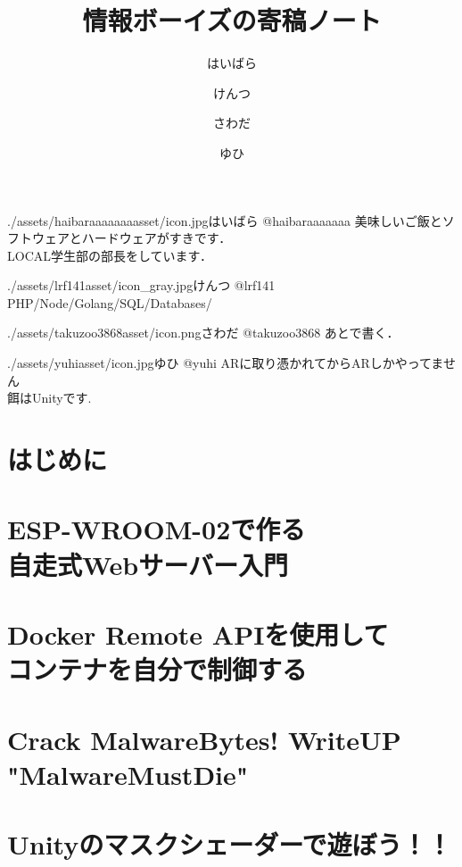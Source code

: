 \documentclass[autodetect-engine,dvipdfmx-if-dvi,ja=standard,b5paper,10.5pt,twoside,openany,layout=v2]{bxjsbook}
\title{情報ボーイズの寄稿ノート}
\author{はいばら \and けんつ \and さわだ \and ゆひ}
\date{}
\newcommand{\articlepath}{./articles}
\newcommand{\assetspath}{./assets}
\newcommand{\lrfasset}{\assetspath/lrf141asset}
\newcommand{\haibaraaaaaaaasset}{\assetspath/haibaraaaaaaaasset}
\newcommand{\yuhiasset}{\assetspath/yuhiasset}
\newcommand{\takuzooasset}{\assetspath/takuzoo3868asset}
\begin{document}
\frontmatter
\maketitle
\begin{myintroduce}{\haibaraaaaaaaasset/icon.jpg}{はいばら @haibaraaaaaaa}
  美味しいご飯とソフトウェアとハードウェアがすきです．\\
  LOCAL学生部の部長をしています．
\end{myintroduce}
\begin{myintroduce}{\lrfasset/icon_gray.jpg}{けんつ @lrf141}
  PHP/Node/Golang/SQL/Databases/
\end{myintroduce}
\begin{myintroduce}{\takuzooasset/icon.png}{さわだ @takuzoo3868}
  あとで書く．
\end{myintroduce}
\begin{myintroduce}{\yuhiasset/icon.jpg}{ゆひ @yuhi}
ARに取り憑かれてからARしかやってません \\
餌はUnityです.
\end{myintroduce}

\chapter{はじめに}
\addtolength{\oddsidemargin}{10pt}
\addtolength{\evensidemargin}{-10pt}


\tableofcontents
\mainmatter

\chapter{ESP-WROOM-02で作る \\自走式Webサーバー入門}


\chapter{Docker Remote APIを使用して\\コンテナを自分で制御する}


\chapter{Crack MalwareBytes! WriteUP "MalwareMustDie"}


\chapter{Unityのマスクシェーダーで遊ぼう！！}


\newpage
\myimpression[%
name=LOCAL Students\\情報ボーイズの寄稿ノート, %
author=はいばら， \and %
けんつ， \and %
さわだ， \and %
ゆひ, %
date=2019年5月3日, %
publisher=LOCAL学生部, %
print=有限会社ねこのしっぽ %
]%
\end{document}
